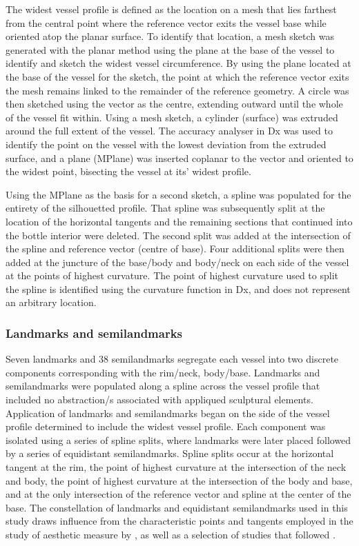 \documentclass[]{interact}
\theoremstyle{plain}%
\theoremstyle{definition}
\theoremstyle{remark}
\begin{document}
The widest vessel profile is defined as the location on a mesh that lies
farthest from the central point where the reference vector exits the
vessel base while oriented atop the planar surface. To identify that
location, a mesh sketch was generated with the planar method using the
plane at the base of the vessel to identify and sketch the widest vessel
circumference. By using the plane located at the base of the vessel for
the sketch, the point at which the reference vector exits the mesh
remains linked to the remainder of the reference geometry. A circle was
then sketched using the vector as the centre, extending outward until
the whole of the vessel fit within. Using a mesh sketch, a cylinder
(surface) was extruded around the full extent of the vessel. The
accuracy analyser in Dx was used to identify the point on the vessel
with the lowest deviation from the extruded surface, and a plane
(MPlane) was inserted coplanar to the vector and oriented to the widest
point, bisecting the vessel at its' widest profile.

Using the MPlane as the basis for a second sketch, a spline was
populated for the entirety of the silhouetted profile. That spline was
subsequently split at the location of the horizontal tangents and the
remaining sections that continued into the bottle interior were deleted.
The second split was added at the intersection of the spline and
reference vector (centre of base). Four additional splits were then
added at the juncture of the base/body and body/neck on each side of the
vessel at the points of highest curvature. The point of highest
curvature used to split the spline is identified using the curvature
function in Dx, and does not represent an arbitrary location.

\hypertarget{landmarks-and-semilandmarks}{%
\subsubsection{Landmarks and
semilandmarks}\label{landmarks-and-semilandmarks}}

Seven landmarks and 38 semilandmarks segregate each vessel into two
discrete components corresponding with the rim/neck, body/base.
Landmarks and semilandmarks were populated along a spline across the
vessel profile that included no abstraction/s associated with appliqued
sculptural elements. Application of landmarks and semilandmarks began on
the side of the vessel profile determined to include the widest vessel
profile. Each component was isolated using a series of spline splits,
where landmarks were later placed followed by a series of equidistant
semilandmarks. Spline splits occur at the horizontal tangent at the rim,
the point of highest curvature at the intersection of the neck and body,
the point of highest curvature at the intersection of the body and base,
and at the only intersection of the reference vector and spline at the
center of the base. The constellation of landmarks and equidistant
semilandmarks used in this study draws influence from the characteristic
points and tangents employed in the study of aesthetic measure by
\citet{RN5700}, as well as a selection of studies that followed
\citep{RN8103,RN8104}.
\end{document}
